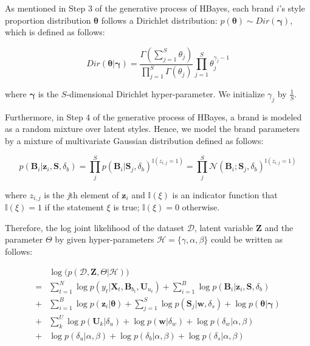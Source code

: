 As mentioned in Step 3 of the generative process of HBayes, each brand $i$'s style proportion distribution $\boldsymbol{\theta}$ follows a Dirichlet distribution: $p(\boldsymbol{\theta}) \sim Dir(\boldsymbol{\gamma})$, which is defined as follows: 

\begin{equation*}
Dir(\bm{\theta}|\bm{\gamma})=\frac{\Gamma(\sum_{j=1}^{S}\theta_j)}{\prod_{j=1}^{S}\Gamma(\theta_j)}\prod_{j=1}^S \theta_j^{\gamma_j-1}
\end{equation*}

\noindent where $\bm{\gamma}$ is the $S$-dimensional Dirichlet hyper-parameter. We initialize $\gamma_j$ by $\frac{1}{S}$. 

Furthermore, in Step 4 of the generative process of HBayes, a brand is modeled as a random mixture over latent styles. Hence, we model the brand parameters by a mixture of multivariate Gaussian distribution defined as follows:

\begin{equation*}
p(\bm{B}_i|\bm{z}_i,\bm{S},\delta_b) = \prod_{j}^S p(\bm{B}_i|\bm{S}_j,\delta_b)^{\mathbb{I}(z_{i,j}=1)} = \prod_{j}^S \mathcal{N}(\bm{B}_i; \bm{S}_j,\delta_b) ^{\mathbb{I}(z_{i,j}=1)}
\end{equation*}

\noindent where $z_{i,j}$ is the \emph{j}th element of $\mathbf{z}_i$ and $\mathbb{I}(\xi)$ is an indicator function that $\mathbb{I}(\xi)=1$ if the statement $\xi$ is true; $\mathbb{I}(\xi)=0$ otherwise.

Therefore, the log joint likelihood of the dataset $\mathcal{D}$, latent variable $\bm{Z}$ and the parameter $\Theta$ by given hyper-parameters $\mathcal{H} = \{\gamma, \alpha,\beta\}$ could be written as follows:

\begin{align}
 & \log \big( p(\mathcal{D},\bm{Z},\Theta|\mathcal{H}) \big) \nonumber \\
= & \sum_{t=1}^N \log p(y_t|\bm{X}_t,\bm{B}_{b_t},\bm{U}_{u_t}) + \sum_{i=1}^B \log p(\bm{B}_i|\bm{z}_i,\bm{S},\delta_b)  \nonumber \\
+ & \sum_{i=1}^B \log p(\bm{z}_{i}|\bm{\theta}) + \sum_{j=1}^S \log p(\bm{S}_j|\bm{w},\delta_s) + \log p(\bm{\theta}|\bm{\gamma})   \nonumber \\
+ & \sum_{k}^U \log p(\bm{U}_k|\delta_u) + \log p(\bm{w}|\delta_w) +  \log p(\delta_w|\alpha,\beta) \nonumber  \\
+ & \log p(\delta_u|\alpha,\beta) + \log p(\delta_b|\alpha,\beta) + \log p(\delta_s|\alpha,\beta)
\label{eq:log_likelihood}
\end{align}

